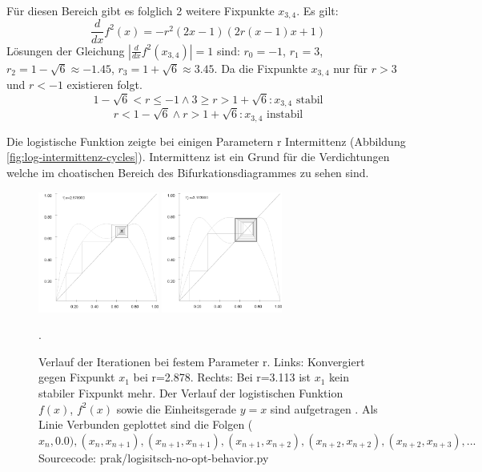 \documentclass{scrartcl}
\begin{document}
Für diesen Bereich gibt es folglich 2 weitere Fixpunkte $x_{3,4}$. 
Es gilt:
\begin{equation}
\frac{d}{dx}f^2(x)=-r^2(2x-1)(2r(x-1)x+1)
\end{equation}
Lösungen der Gleichung $|\frac{d}{dx}f^2(x_{3,4})|=1$ sind: $r_0=-1$, $r_1=3$, $r_2=1-\sqrt{6}\approx-1.45$, $r_3=1+\sqrt{6}\approx3.45$. Da die Fixpunkte $x_{3,4}$ nur für $r>3$ und $r<-1$ existieren folgt.
\begin{equation}1-\sqrt{6}< r \leq -1 \wedge 3 \geq r > 1+\sqrt{6}: x_{3,4} \text{ stabil}
\end{equation}
\begin{equation}r < 1-\sqrt{6} \wedge r>1+\sqrt{6}: x_{3,4} \text{ instabil}
\end{equation}

Die logistische Funktion zeigte bei einigen Parametern r Intermittenz (Abbildung \ref{fig:log-intermittenz-cycles}). Intermittenz ist ein Grund für die Verdichtungen welche im choatischen Bereich des Bifurkationsdiagrammes zu sehen sind.

\begin{figure}[!htbp]
\centering
\includegraphics[height=150px]{fixpunkt-2878}
\includegraphics[height=150px]{fixpunkt-311}
\caption{Verlauf der Iterationen bei festem Parameter r. Links: Konvergiert gegen Fixpunkt $x_1$ bei r=2.878. Rechts: Bei r=3.113 ist $x_1$ kein stabiler Fixpunkt mehr. Der Verlauf der logistischen Funktion $f(x)$, $f^2(x)$ sowie die Einheitsgerade $y=x$ sind aufgetragen . Als Linie Verbunden geplottet sind die Folgen ($x_n, 0.0), (x_n, x_{n+1}), (x_{n+1}, x_{n+1}), (x_{n+1}, x_{n+2}), (x_{n+2}, x_{n+2}), (x_{n+2}, x_{n+3}), ...$ Sourcecode: prak/logisitsch-no-opt-behavior.py}. 
\label{fig:log-iteration-behavior}
\end{figure}
\end{document}
